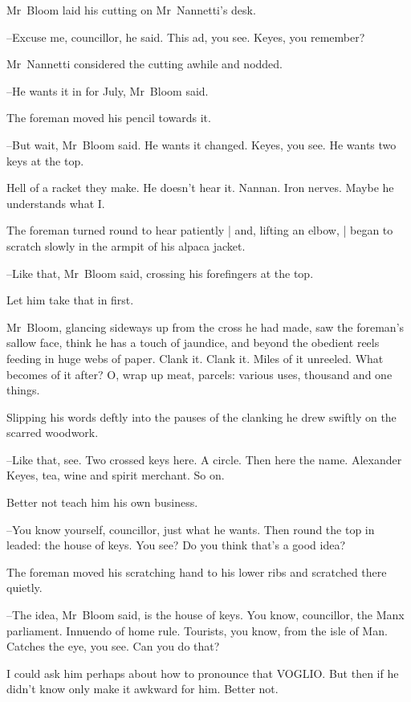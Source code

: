 
Mr~Bloom laid his cutting on Mr~Nannetti's desk.

--Excuse me, councillor,
he said.
This ad, you see.
Keyes, you remember?

Mr~Nannetti considered the cutting awhile and nodded.

--He wants it in for July,
Mr~Bloom said.

The foreman moved his pencil towards it.

--But wait,
Mr~Bloom said.
He wants it changed.
Keyes, you see.
He wants two keys at the top.

Hell of a racket they make.
He doesn't hear it.
Nannan.
Iron nerves.
Maybe he understands what I.

The foreman turned round to hear patiently |
and, lifting an elbow, |
began to scratch slowly in the armpit of his alpaca jacket.

--Like that,
Mr~Bloom said,
crossing his forefingers at the top.

Let him take that in first.

Mr~Bloom,
glancing sideways up from the cross he had made,
saw the foreman's sallow face,
think he has a touch of jaundice,
and beyond
the obedient reels feeding in huge webs of paper.
Clank it.
Clank it.
Miles of it unreeled.
What becomes of it after?
O, wrap up meat, parcels:
various uses,
thousand and one things.

Slipping his words deftly into the pauses of the clanking
he drew swiftly on the scarred woodwork.



--Like that, see.
Two crossed keys here.
A circle.
Then here the name.
Alexander Keyes,
tea, wine and spirit merchant.
So on.

Better not teach him his own business.

--You know yourself, councillor,
just what he wants.
Then round the top in leaded:
the house of keys.
You see?
Do you think that's a good idea?

The foreman moved his scratching hand to his lower ribs
and scratched there quietly.

--The idea,
Mr~Bloom said,
is the house of keys.
You know, councillor,
the Manx parliament.
Innuendo of home rule.
Tourists, you know, from the isle of Man.
Catches the eye, you see.
Can you do that?

I could ask him perhaps about how to pronounce that VOGLIO.
But then if he didn't know
only make it awkward for him.
Better not.

